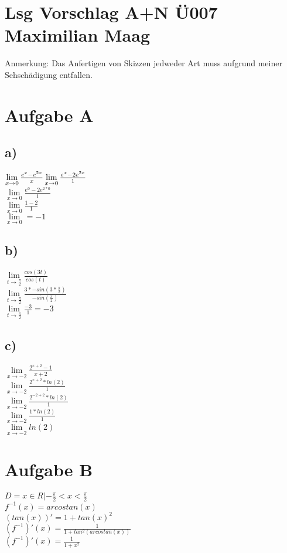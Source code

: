\documentclass{article}
\begin{document}
	\section*{Lsg Vorschlag A+N Ü007 Maximilian Maag}
	Anmerkung: Das Anfertigen von Skizzen jedweder Art muss aufgrund meiner Sehschädigung entfallen.
	\section*{Aufgabe A}
	\subsection*{a)}
	$\lim\limits_{x \to 0}\frac{e^x - e^{2x}}{x} \\ 
	\lim\limits_{x \to 0}\frac{e^x - 2e^{2x}}{1}$ \\
	$\lim\limits_{x \to 0}\frac{e^0 - 2e^{2*0}}{1}$ \\
	$\lim\limits_{x \to 0}\frac{1 - 2}{1}$ \\
	$\lim\limits_{x \to 0} = -1 $
	\subsection*{b)}
	$\lim\limits_{t \to \frac{\pi}{2}} \frac{cos(3t)}{cos(t)}$ \\
	$\lim\limits_{t \to \frac{\pi}{2}} \frac{3*-sin(3*\frac{\pi}{2})}{-sin(\frac{\pi}{2})}$ \\
	$\lim\limits_{t \to \frac{\pi}{2}} \frac{-3}{1} = -3$ \\
	\subsection*{c)}
	$\lim\limits_{x \to -2} \frac{2^{x+2}-1}{x+2}$ \\
	$\lim\limits_{x \to -2} \frac{2^{x+2}*ln(2)}{1}$ \\
	$\lim\limits_{x \to -2} \frac{2^{-2+2}*ln(2)}{1}$ \\
	$\lim\limits_{x \to -2} \frac{1*ln(2)}{1}$ \\
	$\lim\limits_{x \to -2} ln(2)$ \\
	\section*{Aufgabe B}
	$D = x \in R | -\frac{\pi}{2} < x < \frac{\pi}{2}$ \\
	$f^{-1}(x) = arcostan(x)$ \\
	$(tan(x))' = 1 + tan(x)^2$ \\
	$(f^{-1})'(x) = \frac{1}{1 + tan^2(arcostan(x))}$ \\
	$(f^{-1})'(x) = \frac{1}{1 + x^2}$ \\
\end{document}
